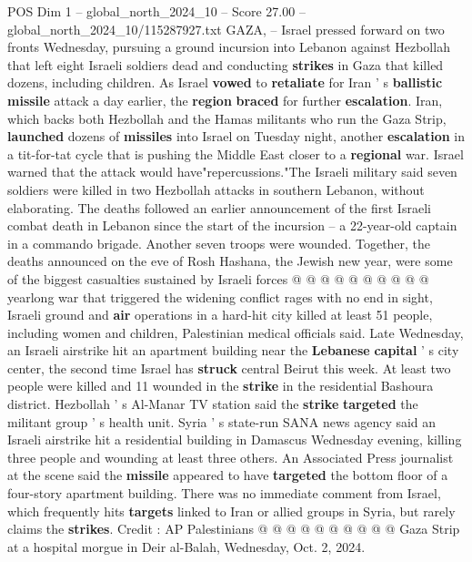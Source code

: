 \begin{textsample}{POS Dim 1 – global\_north\_2024\_10 – Score 27.00 – global\_north\_2024\_10/115287927.txt}  \label{ex:f1_pos_084}
GAZA, -- Israel pressed forward on two fronts Wednesday, pursuing a ground incursion into Lebanon against Hezbollah that left eight Israeli soldiers dead and conducting \textbf{strikes} in Gaza that killed dozens, including children.
As Israel \textbf{vowed} to \textbf{retaliate} for Iran ' s \textbf{ballistic} \textbf{missile} attack a day earlier, the \textbf{region} \textbf{braced} for further \textbf{escalation}.
Iran, which backs both Hezbollah and the Hamas militants who run the Gaza Strip, \textbf{launched} dozens of \textbf{missiles} into Israel on Tuesday night, another \textbf{escalation} in a tit-for-tat cycle that is pushing the Middle East closer to a \textbf{regional} war.
Israel warned that the attack would have"repercussions."The Israeli military said seven soldiers were killed in two Hezbollah attacks in southern Lebanon, without elaborating.
The deaths followed an earlier announcement of the first Israeli combat death in Lebanon since the start of the incursion -- a 22-year-old captain in a commando brigade.
Another seven troops were wounded.
Together, the deaths announced on the eve of Rosh Hashana, the Jewish new year, were some of the biggest casualties sustained by Israeli forces @ @ @ @ @ @ @ @ @ @ yearlong war that triggered the widening conflict rages with no end in sight, Israeli ground and \textbf{air} operations in a hard-hit city killed at least 51 people, including women and children, Palestinian medical officials said.
Late Wednesday, an Israeli airstrike hit an apartment building near the \textbf{Lebanese} \textbf{capital} ' s city center, the second time Israel has \textbf{struck} central Beirut this week.
At least two people were killed and 11 wounded in the \textbf{strike} in the residential Bashoura district.
Hezbollah ' s Al-Manar TV station said the \textbf{strike} \textbf{targeted} the militant group ' s health unit.
Syria ' s state-run SANA news agency said an Israeli airstrike hit a residential building in Damascus Wednesday evening, killing three people and wounding at least three others.
An Associated Press journalist at the scene said the \textbf{missile} appeared to have \textbf{targeted} the bottom floor of a four-story apartment building.
There was no immediate comment from Israel, which frequently hits \textbf{targets} linked to Iran or allied groups in Syria, but rarely claims the \textbf{strikes}.
Credit : AP Palestinians @ @ @ @ @ @ @ @ @ @ Gaza Strip at a hospital morgue in Deir al-Balah, Wednesday, Oct. 2, 2024.

\end{textsample}
